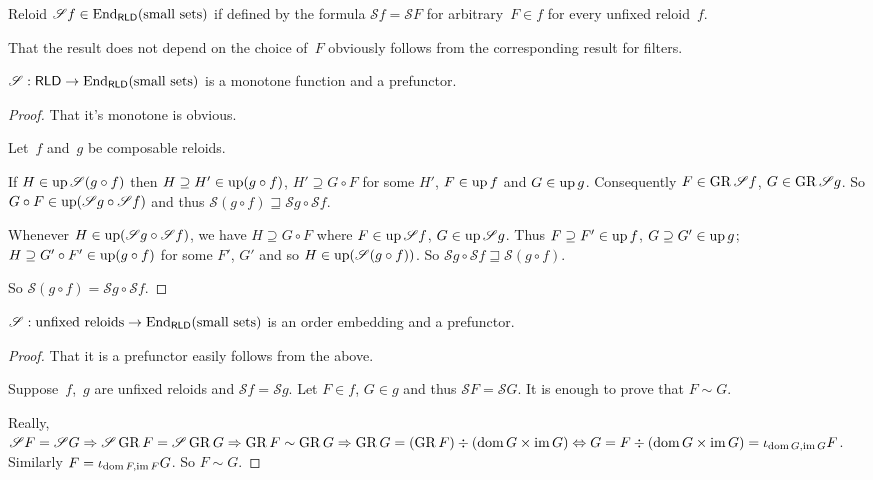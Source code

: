 \begin{defn}
Reloid
$\mathscr{S}f\in\operatorname{End}_{\mathsf{RLD}}(\text{small sets})$
if defined by the formula
$\mathscr{S}f=\mathscr{S}F$ for arbitrary~$F\in f$
for every unfixed reloid~$f$.
\end{defn}

That the result does not depend on the choice of~$F$
obviously follows from the corresponding result for
filters.

\begin{prop}
$\mathscr{S}:\mathsf{RLD}\to
\operatorname{End}_{\mathsf{RLD}}(\text{small sets})$
is a monotone function and a prefunctor.
\end{prop}

\begin{proof}
That it's monotone is obvious.

Let~$f$ and~$g$ be composable reloids.

If $H\in\operatorname{up}\mathscr{S}(g\circ f)$ then
$H\supseteq H'\in\operatorname{up}(g\circ f)$,
$H'\supseteq G\circ F$ for some $H'$,
$F\in\operatorname{up} f$ and $G\in\operatorname{up} g$. Consequently
$F\in\operatorname{GR}\mathscr{S}f$, $G\in\operatorname{GR}\mathscr{S}g$. So
$G\circ F\in\operatorname{up}(\mathscr{S}g\circ\mathscr{S}f)$
and thus
$\mathscr{S}(g\circ f)\sqsupseteq
\mathscr{S}g\circ\mathscr{S}f$.

Whenever $H\in\operatorname{up}(\mathscr{S}g\circ\mathscr{S}f)$,
we have
$H\supseteq G\circ F$ where $F\in\operatorname{up}\mathscr{S}f$,
$G\in\operatorname{up}\mathscr{S}g$. Thus
$F\supseteq F'\in\operatorname{up} f$, $G\supseteq G'\in\operatorname{up} g$;
$H\supseteq G'\circ F'\in\operatorname{up}(g\circ f)$
for some $F'$, $G'$ and so
$H\in\operatorname{up}(\mathscr{S}(g\circ f))$. So
$\mathscr{S}g\circ\mathscr{S}f\sqsupseteq
\mathscr{S}(g\circ f)$.

So
$\mathscr{S}(g\circ f)=\mathscr{S}g\circ\mathscr{S}f$.
\end{proof}

\begin{prop}
$\mathscr{S}:\text{unfixed reloids}\to
\operatorname{End}_{\mathsf{RLD}}(\text{small sets})$
is an order embedding and a prefunctor.
\end{prop}

\begin{proof}
That it is a prefunctor easily follows from the above.

Suppose~$f$,~$g$ are unfixed reloids and
$\mathscr{S}f=\mathscr{S}g$.
Let $F\in f$, $G\in g$ and thus
$\mathscr{S}F=\mathscr{S}G$.
It is enough to prove that $F\sim G$.

Really, $\mathscr{S}F=\mathscr{S}G\Rightarrow
\mathscr{S}\operatorname{GR} F=\mathscr{S}\operatorname{GR} G\Rightarrow
\operatorname{GR} F\sim\operatorname{GR} G\Rightarrow
\operatorname{GR} G=(\operatorname{GR} F)\div(\operatorname{dom} G\times\operatorname{im} G)\Leftrightarrow
G=F\div(\operatorname{dom} G\times\operatorname{im} G)=
\iota_{\operatorname{dom} G,\operatorname{im} G}F$.
Similarly $F=\iota_{\operatorname{dom} F,\operatorname{im} F}G$.
So $F\sim G$.
\end{proof}

